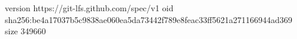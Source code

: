 version https://git-lfs.github.com/spec/v1
oid sha256:be4a17037b5c9838ae060ea5da73442f789e8feac33ff5621a271166944ad369
size 349660
